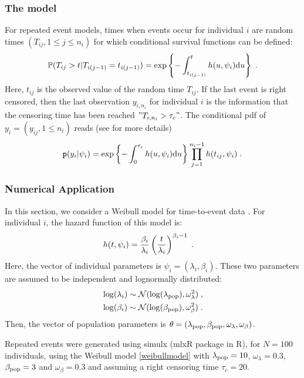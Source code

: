 \subsubsection{The model}

For repeated event models, times when events occur for individual $i$ are random times $(T_{ij}, 1\leq j \leq n_i)$  for which conditional survival functions can be defined:
\begin{equation}
\mathbb{P}(T_{ij} > t|T_{i(j-1)}=t_{i(j-1)}) = \exp\left\{-\int_{t_{i(j-1)}}^{t}h(u, \psi_i)\textrm{d}u\right\}\;.
\end{equation}
Here, $t_{ij}$ is the observed value of the random time $T_{ij}$.
If the last event is right censored, then the last observation $y_{i,n_i}$ for individual $i$ is the information that the censoring time has been reached $"T_{i,n_i} > \tau_c"$. The conditional pdf of $y_i = (y_{ij},1\leq n_i)$ reads (see \citep{laviellebook} for more details)
\begin{equation} \label{pdf_tte}
\texttt{p}(y_i |\psi_i) = \exp\left\{-\int_{0}^{\tau_c}h(u, \psi_i)\textrm{d}u \right\} \prod_{j=1}^{n_i-1} h(t_{ij},\psi_i)\;.
\end{equation}
\subsubsection{Numerical Application}
In this section, we consider a Weibull model for time-to-event data \citep{laviellebook, zhang}. For individual $i$, the hazard function of this model is:
\begin{align}\label{weibullmodel}
& h(t, \psi_i) = \frac{\beta_i}{\lambda_i}\left(\frac{t}{\lambda_i}\right)^{\beta_i-1}\;.
\end{align}
Here, the vector of individual parameters is $\psi_i = (\lambda_i, \beta_i)$. These two parameters are assumed to be independent and  lognormally distributed:
\begin{align} \label{indivtte}
& \log(\lambda_i) \sim \mathcal{N}(\log(\lambda_{\rm pop}), \omega^2_{\lambda})\;,\\
& \log(\beta_i) \sim \mathcal{N}(\log(\beta_{\rm pop}), \omega^2_{\beta})\;.
\end{align}
Then, the vector of population parameters is $\theta = (\lambda_{\rm pop}, \beta_{\rm pop}, \omega_{\lambda}, \omega_{\beta})$.

Repeated events were generated using simulx (mlxR package in R), for $N=100$ individuals, using the Weibull model \eqref{weibullmodel} with $\lambda_{\rm pop} = 10$, $\omega_{\lambda} = 0.3$, $\beta_{\rm pop} = 3$ and $\omega_{\beta} = 0.3$ and assuming a right censoring time $\tau_c = 20$.

